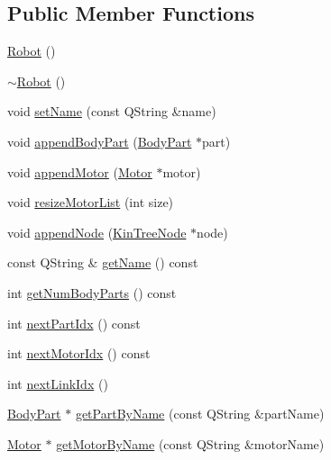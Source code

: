 \subsection*{Public Member Functions}
\begin{DoxyCompactItemize}
\item 
\hyperlink{class_robot_model_1_1_robot_a4fc7c70ae20623f05e06f2ecb388b6c4}{Robot} ()
\item 
\hyperlink{class_robot_model_1_1_robot_a924320124b09c2f2ac1621aa210d5f38}{$\sim$Robot} ()
\item 
void \hyperlink{class_robot_model_1_1_robot_a0e3187d8a543ab03029138ea836ed546}{setName} (const QString \&name)
\item 
void \hyperlink{class_robot_model_1_1_robot_a44d1922d7d9ea6c7c90360c2443b1ec3}{appendBodyPart} (\hyperlink{class_robot_model_1_1_body_part}{BodyPart} $\ast$part)
\item 
void \hyperlink{class_robot_model_1_1_robot_aa4db18e00b4e4c56a37943a0b45d1c3b}{appendMotor} (\hyperlink{class_robot_model_1_1_motor}{Motor} $\ast$motor)
\item 
void \hyperlink{class_robot_model_1_1_robot_a2521948f148183c97428155be0eea923}{resizeMotorList} (int size)
\item 
void \hyperlink{class_robot_model_1_1_robot_aa6a72690fe4b0d1a2178f5478d3829bf}{appendNode} (\hyperlink{class_robot_model_1_1_kin_tree_node}{KinTreeNode} $\ast$node)
\item 
const QString \& \hyperlink{class_robot_model_1_1_robot_a07a4dcd2c34da89415576c53b42d9406}{getName} () const 
\item 
int \hyperlink{class_robot_model_1_1_robot_a16f942cf3364608585f5a352be0dc286}{getNumBodyParts} () const 
\item 
int \hyperlink{class_robot_model_1_1_robot_ad2827f8919f3cce0d39b89fb3fb33217}{nextPartIdx} () const 
\item 
int \hyperlink{class_robot_model_1_1_robot_ac9919cc40764e47d97fa591018bfbe67}{nextMotorIdx} () const 
\item 
int \hyperlink{class_robot_model_1_1_robot_a465bb3898172af37d6dec1885da0fec0}{nextLinkIdx} ()
\item 
\hyperlink{class_robot_model_1_1_body_part}{BodyPart} $\ast$ \hyperlink{class_robot_model_1_1_robot_af23f77831c87476ad0a43c624dd4b254}{getPartByName} (const QString \&partName)
\item 
\hyperlink{class_robot_model_1_1_motor}{Motor} $\ast$ \hyperlink{class_robot_model_1_1_robot_a41d959b8a9f469ee1caa5e3881a9445f}{getMotorByName} (const QString \&motorName)

\end{DoxyCompactItemize}
